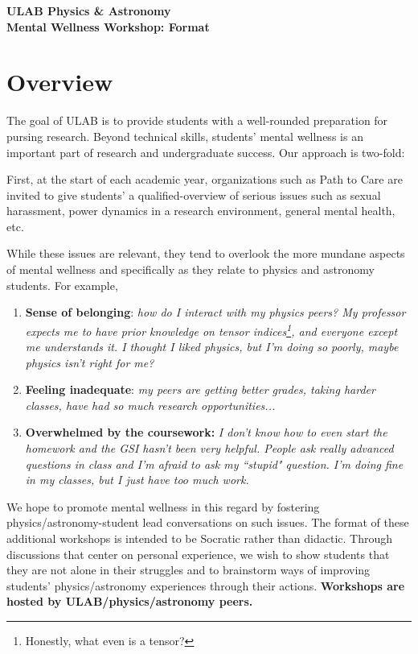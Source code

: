 \documentclass[addpoints,12pt]{exam}
\numberwithin{equation}{section}
\begin{document}
	
	\begin{center}
		\textbf{\Large{ULAB Physics \& Astronomy\\Mental Wellness Workshop: Format}}
	\end{center}

	\section{Overview}
	
	The goal of ULAB is to provide students with a well-rounded preparation for pursing research. Beyond technical skills, students' mental wellness is an important part of research and undergraduate success. Our approach is two-fold:
	
	First, at the start of each academic year, organizations such as Path to Care are invited to give students' a qualified-overview of serious issues such as sexual harassment, power dynamics in a research environment, general mental health, etc.
	
	While these issues are relevant, they tend to overlook the more mundane aspects of mental wellness and specifically as they relate to physics and astronomy students. For example, 
	\begin{enumerate}
		\item \textbf{Sense of belonging}: \textit{how do I interact with my physics peers? My professor expects me to have prior knowledge on tensor indices\footnote{Honestly, what even is a tensor?}, and everyone except me understands it. I thought I liked physics, but I'm doing so poorly, maybe physics isn't right for me?}
		\item \textbf{Feeling inadequate}: \textit{my peers are getting better grades, taking harder classes, have had so much research opportunities...}
		\item \textbf{Overwhelmed by the coursework:} \textit{I don't know how to even start the homework and the GSI hasn't been very helpful. People ask really advanced questions in class and I'm afraid to ask my ``stupid" question. I'm doing fine in my classes, but I just have too much work.}
	\end{enumerate}
	
	We hope to promote mental wellness in this regard by fostering physics/astronomy-student  lead conversations on such issues. The format of these additional workshops is intended to be Socratic rather than didactic. Through discussions that center on personal experience, we wish to show students that they are not alone in their struggles and to brainstorm ways of improving students' physics/astronomy experiences through their actions. \textbf{Workshops are hosted by ULAB/physics/astronomy peers.}
	
\end{document}
